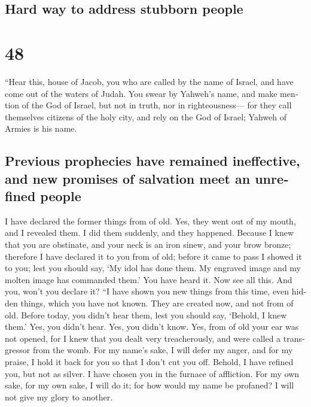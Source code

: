 \begin{paracol}{2}
\switchcolumn
\begin{otherlanguage}{english}

\hypertarget{hard-way-to-address-stubborn-people}{%
\subsection{Hard way to address stubborn
people}\label{hard-way-to-address-stubborn-people}}

\hypertarget{section-95}{%
\section{48}\label{section-95}}

 ``Hear this, house of Jacob, you who are called by the
name of Israel, and have come out of the waters of Judah. You swear by
Yahweh's name, and make mention of the God of Israel, but not in truth,
nor in righteousness---  for they call themselves citizens
of the holy city, and rely on the God of Israel; Yahweh of Armies is his
name.

\hypertarget{previous-prophecies-have-remained-ineffective-and-new-promises-of-salvation-meet-an-unrefined-people}{%
\subsection{Previous prophecies have remained ineffective, and new
promises of salvation meet an unrefined
people}\label{previous-prophecies-have-remained-ineffective-and-new-promises-of-salvation-meet-an-unrefined-people}}

 I have declared the former things from of old. Yes, they
went out of my mouth, and I revealed them. I did them suddenly, and they
happened.  Because I knew that you are obstinate, and your
neck is an iron sinew, and your brow bronze;  therefore I
have declared it to you from of old; before it came to pass I showed it
to you; lest you should say, `My idol has done them. My engraved image
and my molten image has commanded them.'  You have heard
it. Now see all this. And you, won't you declare it? ``I have shown you
new things from this time, even hidden things, which you have not known.
 They are created now, and not from of old. Before today,
you didn't hear them, lest you should say, `Behold, I knew them.'
 Yes, you didn't hear. Yes, you didn't know. Yes, from of
old your ear was not opened, for I knew that you dealt very
treacherously, and were called a transgressor from the womb.
 For my name's sake, I will defer my anger, and for my
praise, I hold it back for you so that I don't cut you off.
 Behold, I have refined you, but not as silver. I have
chosen you in the furnace of affliction.  For my own
sake, for my own sake, I will do it; for how would my name be profaned?
I will not give my glory to another.


\end{otherlanguage}
\end{paracol}
